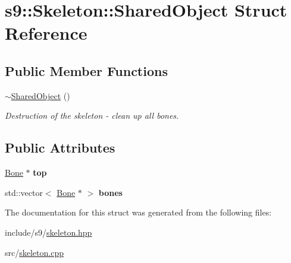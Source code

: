 \hypertarget{structs9_1_1Skeleton_1_1SharedObject}{\section{s9\-:\-:Skeleton\-:\-:Shared\-Object Struct Reference}
\label{structs9_1_1Skeleton_1_1SharedObject}
}
\subsection*{Public Member Functions}
\begin{DoxyCompactItemize}
\item 
\hypertarget{structs9_1_1Skeleton_1_1SharedObject_ae8ec96fea2c1cd3bf8b3d4424a1dd4bd}{\hyperlink{structs9_1_1Skeleton_1_1SharedObject_ae8ec96fea2c1cd3bf8b3d4424a1dd4bd}{$\sim$\-Shared\-Object} ()}\label{structs9_1_1Skeleton_1_1SharedObject_ae8ec96fea2c1cd3bf8b3d4424a1dd4bd}

\begin{DoxyCompactList}\small\item\em Destruction of the skeleton -\/ clean up all bones. \end{DoxyCompactList}\end{DoxyCompactItemize}
\subsection*{Public Attributes}
\begin{DoxyCompactItemize}
\item 
\hypertarget{structs9_1_1Skeleton_1_1SharedObject_a89c81d6cccbe31c0788199044eed78a0}{\hyperlink{structs9_1_1Bone}{Bone} $\ast$ {\bfseries top}}\label{structs9_1_1Skeleton_1_1SharedObject_a89c81d6cccbe31c0788199044eed78a0}

\item 
\hypertarget{structs9_1_1Skeleton_1_1SharedObject_aa74c3be43e07d1abd4d68a09aa9575d6}{std\-::vector$<$ \hyperlink{structs9_1_1Bone}{Bone} $\ast$ $>$ {\bfseries bones}}\label{structs9_1_1Skeleton_1_1SharedObject_aa74c3be43e07d1abd4d68a09aa9575d6}

\end{DoxyCompactItemize}


The documentation for this struct was generated from the following files\-:\begin{DoxyCompactItemize}
\item 
include/s9/\hyperlink{skeleton_8hpp}{skeleton.\-hpp}\item 
src/\hyperlink{skeleton_8cpp}{skeleton.\-cpp}\end{DoxyCompactItemize}
